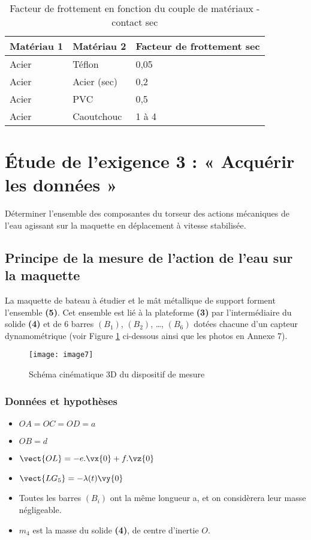 \begin{table}[!h]
\centering
\begin{tabular}{lll}
\hline
\textbf{Matériau 1} & \textbf{Matériau 2} & \textbf{Facteur de frottement sec} \\ 
\hline
Acier	& Téflon & 0,05 \\
Acier	& Acier (sec) & 0,2\\
Acier	& PVC & 0,5\\
Acier	& Caoutchouc & 1 à 4\\
\hline
\end{tabular}
\caption{ \label{tab:CCMP:2021:01} Facteur de frottement en fonction du couple de matériaux - contact sec}
\end{table} 

\section{Étude de l'exigence 3 : « Acquérir les données »}
\begin{obj}
Déterminer l'ensemble des composantes du torseur des actions mécaniques de l'eau agissant sur la maquette en déplacement à vitesse stabilisée.
\end{obj}
\subsection{Principe de la mesure de l’action de l’eau sur la maquette}
La maquette de bateau à étudier et le mât métallique de support forment l’ensemble \textbf{\textbf{(5)}}. Cet ensemble est lié à la plateforme \textbf{(3)} par l’intermédiaire du solide \textbf{(4)} et de 6 barres 
$(B_1)$, $(B_2)$, …, $(B_6)$ dotées chacune d’un capteur dynamométrique (voir Figure \ref{fig:CCMP:2021:07} ci-dessous ainsi que les photos en Annexe 7).
 
\begin{figure}[!h]
\centering
\texttt{[image: image7]}
\caption{ \label{fig:CCMP:2021:07} Schéma cinématique 3D du dispositif de mesure}
\end{figure} 

\subsubsection*{Données et hypothèses}
 \begin{itemize}
 \item $OA=OC=OD=a$
 \item $OB=d$
 \item $\vect{OL}=-e.\vx{0}+f.\vz{0}$
 \item $\vect{LG_5}=-\lambda (t) \vy{0}$
 \item Toutes les barres $(B_i)$ ont la même longueur a, et on considèrera leur masse négligeable.
 \item $m_4$ est la masse du solide \textbf{(4)}, de centre d’inertie $O$.
\end{itemize} 

